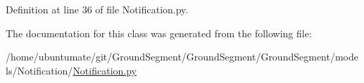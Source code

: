 Definition at line 36 of file Notification.\+py.



The documentation for this class was generated from the following file\+:\begin{DoxyCompactItemize}
\item 
/home/ubuntumate/git/\+Ground\+Segment/\+Ground\+Segment/\+Ground\+Segment/models/\+Notification/\hyperlink{_notification_8py}{Notification.\+py}\end{DoxyCompactItemize}
